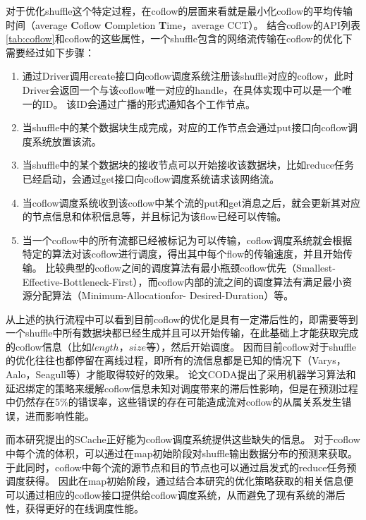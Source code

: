 对于优化shuffle这个特定过程，在coflow的层面来看就是最小化coflow的平均传输时间（average \textbf{C}oflow \textbf{C}ompletion \textbf{T}ime，average CCT）。
结合coflow的API列表\ref{tab:coflow}和coflow的这些属性，一个shuffle包含的网络流传输在coflow的优化下需要经过如下步骤：
\begin{enumerate}
	\item 通过Driver调用create接口向coflow调度系统注册该shuffle对应的coflow，此时Driver会返回一个与该coflow唯一对应的handle，在具体实现中可以是一个唯一的ID。
	该ID会通过广播的形式通知各个工作节点。
	\item 当shuffle中的某个数据块生成完成，对应的工作节点会通过put接口向coflow调度系统放置该流。
	\item 当shuffle中的某个数据块的接收节点可以开始接收该数据块，比如reduce任务已经启动，会通过get接口向coflow调度系统请求该网络流。
	\item 当coflow调度系统收到该coflow中某个流的put和get消息之后，就会更新其对应的节点信息和体积信息等，并且标记为该flow已经可以传输。
	\item 当一个coflow中的所有流都已经被标记为可以传输，coflow调度系统就会根据特定的算法对该coflow进行调度，得出其中每个flow的传输速度，并且开始传输。
	比较典型的coflow之间的调度算法有最小瓶颈coflow优先（Smallest-Effective-Bottleneck-First）\cite{varys}，而coflow内部的流之间的调度算法有满足最小资源分配算法（Minimum-Allocationfor-
	Desired-Duration）\cite{varys}等。
\end{enumerate}

从上述的执行流程中可以看到目前coflow的优化是具有一定滞后性的，即需要等到一个shuffle中所有数据块都已经生成并且可以开始传输，在此基础上才能获取完成的coflow信息（比如$length$，$size$等），然后开始调度。
因而目前coflow对于shuffle的优化往往也都停留在离线过程，即所有的流信息都是已知的情况下（Varys\cite{varys}，Aalo\cite{aalo}，Seagull\cite{seagull}等）才能取得较好的效果。
论文CODA\cite{coda}提出了采用机器学习算法和延迟绑定的策略来缓解coflow信息未知对调度带来的滞后性影响，但是在预测过程中仍然存在5\%的错误率，这些错误的存在可能造成流对coflow的从属关系发生错误，进而影响性能。

而本研究提出的SCache正好能为coflow调度系统提供这些缺失的信息。
对于coflow中每个流的体积，可以通过在map初始阶段对shuffle输出数据分布的预测来获取。
于此同时，coflow中每个流的源节点和目的节点也可以通过启发式的reduce任务预调度获得。
因此在map初始阶段，通过结合本研究的优化策略获取的相关信息便可以通过相应的coflow接口提供给coflow调度系统，从而避免了现有系统的滞后性，获得更好的在线调度性能。

